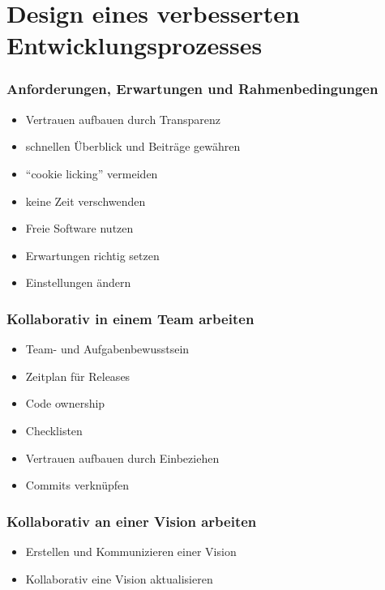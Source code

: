 \documentclass{beamer}
\begin{document}
\section{Design eines verbesserten Entwicklungsprozesses}

\begin{frame}
\frametitle{Anforderungen, Erwartungen und Rahmenbedingungen}
\begin{itemize}
 \item Vertrauen aufbauen durch Transparenz
 \item schnellen \"Uberblick und Beitr\"age gew\"ahren
 \item ``cookie licking'' vermeiden
 \item keine Zeit verschwenden
 \item Freie Software nutzen
 \item Erwartungen richtig setzen
 \item Einstellungen \"andern
\end{itemize}
\end{frame}

\begin{frame}
\frametitle{Kollaborativ in einem Team arbeiten}
\begin{itemize}
 \item Team- und Aufgabenbewusstsein
 \item Zeitplan f\"ur Releases
 \item Code ownership
 \item Checklisten
 \item Vertrauen aufbauen durch Einbeziehen
 \item Commits verkn\"upfen
\end{itemize}
\end{frame}

\begin{frame}
\frametitle{Kollaborativ an einer Vision arbeiten}
\begin{itemize}
 \item Erstellen und Kommunizieren einer Vision
 \item Kollaborativ eine Vision aktualisieren
\end{itemize}
\end{frame}
\end{document}
